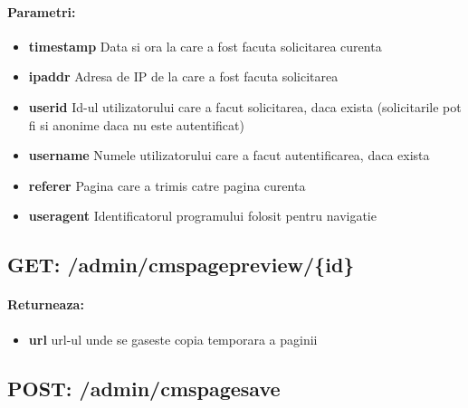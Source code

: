 \paragraph{Parametri:}
\begin{itemize}
\item \textbf{timestamp}
 Data si ora la care a fost facuta solicitarea curenta
\item \textbf{ipaddr}
 Adresa de IP de la care a fost facuta solicitarea
\item \textbf{userid}
 Id-ul utilizatorului care a facut solicitarea, daca exista (solicitarile pot fi si anonime daca nu este autentificat)
\item \textbf{username}
 Numele utilizatorului care a facut autentificarea, daca exista
\item \textbf{referer}
 Pagina care a trimis catre pagina curenta
\item \textbf{useragent}
 Identificatorul programului folosit pentru navigatie
 \end{itemize}
 \subsection*{GET: /admin/cmspagepreview/\{id\}}

\paragraph{Returneaza:}
\begin{itemize}
\item \textbf{url}
 url-ul unde se gaseste copia temporara a paginii
 \end{itemize}
 \subsection*{POST: /admin/cmspagesave}

